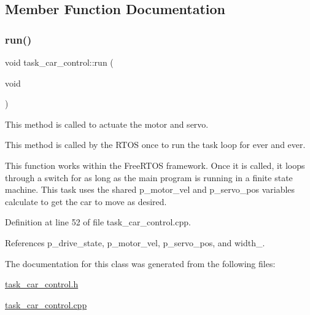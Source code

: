 \subsection{Member Function Documentation}
\mbox{\label{classtask__car__control_a797dbdeb270271b48c468442d3ab91bd}} 
\subsubsection{\texorpdfstring{run()}{run()}}
{\footnotesize\ttfamily void task\+\_\+car\+\_\+control\+::run (\begin{DoxyParamCaption}\item[{void}]{ }\end{DoxyParamCaption})}



This method is called to actuate the motor and servo. 

This method is called by the R\+T\+OS once to run the task loop for ever and ever.

This function works within the Free\+R\+T\+OS framework. Once it is called, it loops through a switch for as long as the main program is running in a finite state machine. This task uses the shared p\+\_\+motor\+\_\+vel and p\+\_\+servo\+\_\+pos variables calculate to get the car to move as desired. 

Definition at line 52 of file task\+\_\+car\+\_\+control.\+cpp.



References p\+\_\+drive\+\_\+state, p\+\_\+motor\+\_\+vel, p\+\_\+servo\+\_\+pos, and width\+\_.



The documentation for this class was generated from the following files\+:\begin{DoxyCompactItemize}
\item 
\mbox{\hyperlink{task__car__control_8h}{task\+\_\+car\+\_\+control.\+h}}\item 
\mbox{\hyperlink{task__car__control_8cpp}{task\+\_\+car\+\_\+control.\+cpp}}\end{DoxyCompactItemize}
